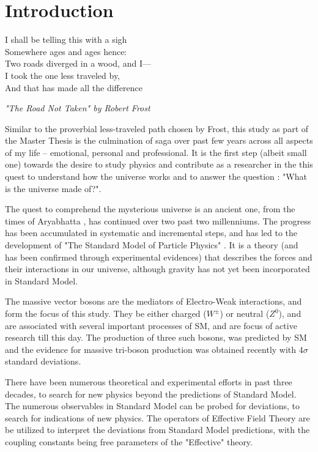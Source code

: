 
\chapter{Introduction}
\label{sec:intro}
\epigraph{I shall be telling this with a sigh\\
	Somewhere ages and ages hence:\\
	Two roads diverged in a wood, and I—\\
	I took the one less traveled by,\\
	And that has made all the difference}{\textit{"The Road Not Taken" by Robert Frost \cite{Frost}}}


Similar to the proverbial less-traveled path chosen by Frost, this study as part of the Master Thesis is the culmination of saga over past few years across all aspects of my life -- emotional, personal and professional. It is the first step (albeit small one)  towards the desire to study physics and contribute as a researcher in the this quest to understand how the universe works and to answer the question : "What is the universe made of?".

The quest to comprehend the mysterious universe is an ancient one, from the times of Aryabhatta \cite{Aryabhatta}, has continued over two past two millenniums. The progress has been accumulated in systematic and incremental steps, and has led to the development of "The Standard Model of Particle Physics" \cite{Thomson}. It is a theory (and has been confirmed through experimental evidences) that describes the forces and their interactions in our universe, although gravity has not yet been incorporated in Standard Model. 

The massive vector bosons are the mediators of Electro-Weak interactions, and form the focus of this study. They be either charged (\textit{$W^{\pm} $}) or neutral ($ \textit{Z}^{0} $), and are associated with several important processes of SM, and are focus of active research till this day. The production of three such bosons, was predicted by SM and the evidence for massive tri-boson production was obtained recently \cite{Aad:2019udh} with 4$ \sigma$ standard deviations. 

There have been numerous theoretical and experimental efforts in past three decades, to search for new physics beyond the predictions of Standard Model. The numerous observables in Standard Model can be probed for deviations, to search for indications of new physics. The operators of Effective Field Theory are be utilized to interpret the deviations from Standard Model predictions, with the coupling constants being free parameters of the "Effective" theory. 


